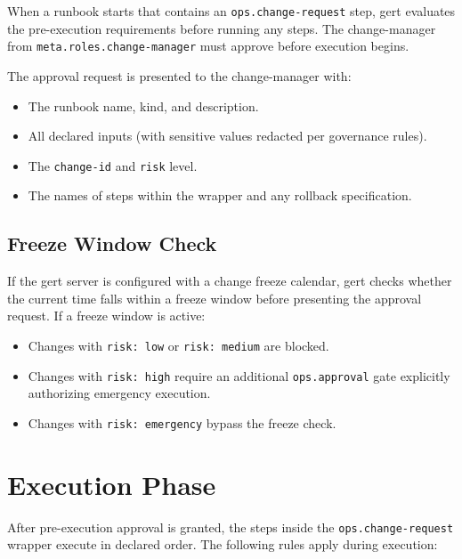 When a runbook starts that contains an \texttt{ops.change-request} step, gert evaluates the
pre-execution requirements before running any steps. The change-manager from
\texttt{meta.roles.change-manager} must approve before execution begins.

The approval request is presented to the change-manager with:
\begin{itemize}
  \item The runbook name, kind, and description.
  \item All declared inputs (with sensitive values redacted per governance rules).
  \item The \texttt{change-id} and \texttt{risk} level.
  \item The names of steps within the wrapper and any rollback specification.
\end{itemize}

\subsection{Freeze Window Check}

If the gert server is configured with a change freeze calendar, gert checks whether the
current time falls within a freeze window before presenting the approval request. If a freeze
window is active:
\begin{itemize}
  \item Changes with \texttt{risk: low} or \texttt{risk: medium} are blocked.
  \item Changes with \texttt{risk: high} require an additional \texttt{ops.approval} gate
    explicitly authorizing emergency execution.
  \item Changes with \texttt{risk: emergency} bypass the freeze check.
\end{itemize}

\section{Execution Phase}
\label{sec:cr-execution}

After pre-execution approval is granted, the steps inside the \texttt{ops.change-request}
wrapper execute in declared order. The following rules apply during execution:

